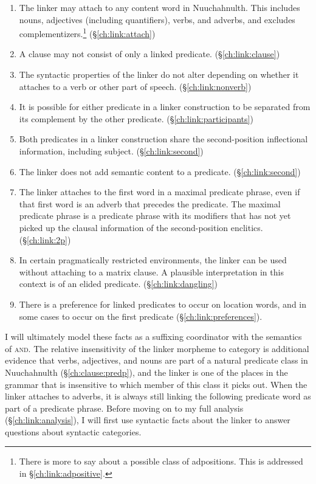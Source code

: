 \begin{enumerate}[nolistsep]
	\item The linker may attach to any content word in Nuuchahnulth. This includes nouns, adjectives (including quantifiers), verbs, and adverbs, and excludes complementizers.\footnote{There is more to say about a possible class of adpositions. This is addressed in \S\ref{ch:link:adpositive}.} (\S\ref{ch:link:attach})
	\item A clause may not consist of only a linked predicate. (\S\ref{ch:link:clause})
	\item The syntactic properties of the linker do not alter depending on whether it attaches to a verb or other part of speech. (\S\ref{ch:link:nonverb})
	\item It is possible for either predicate in a linker construction to be separated from its complement by the other predicate. (\S\ref{ch:link:participants})
	\item Both predicates in a linker construction share the second-position inflectional information, including subject. (\S\ref{ch:link:second})
	\item The linker does not add semantic content to a predicate. (\S\ref{ch:link:second})
	\item The linker attaches to the first word in a maximal predicate phrase, even if that first word is an adverb that precedes the predicate. The maximal predicate phrase is a predicate phrase with its modifiers that has not yet picked up the clausal information of the second-position enclitics. (\S\ref{ch:link:2p})
	\item In certain pragmatically restricted environments, the linker can be used without attaching to a matrix clause. A plausible interpretation in this context is of an elided predicate. (\S\ref{ch:link:dangling})
	\item There is a preference for linked predicates to occur on location words, and in some cases to occur on the first predicate (\S\ref{ch:link:preferences}).
\end{enumerate}

I will ultimately model these facts as a suffixing coordinator with the semantics of \textsc{and}. The relative insensitivity of the linker morpheme to category is additional evidence that verbs, adjectives, and nouns are part of a natural predicate class in Nuuchahnulth (\S\ref{ch:clause:predp}), and the linker is one of the places in the grammar that is insensitive to which member of this class it picks out. When the linker attaches to adverbs, it is always still linking the following predicate word as part of a predicate phrase. Before moving on to my full analysis (\S\ref{ch:link:analysis}), I will first use syntactic facts about the linker to answer questions about syntactic categories.

